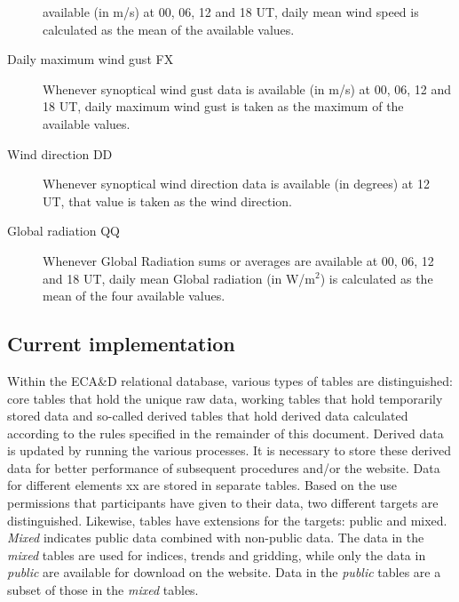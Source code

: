 \documentclass[a4paper,11pt]{article}
\begin{document}
\begin{description}
available (in m/s) at 00, 06, 12 and 18 UT, daily mean wind speed is
calculated as the mean of the available values.
\item[Daily maximum wind gust FX] Whenever synoptical wind gust data
is available (in m/s) at 00, 06, 12 and 18 UT, daily maximum wind gust
is taken as the maximum of the available values.
\item[Wind direction DD] Whenever synoptical wind direction data is
available (in degrees) at 12 UT, that value is taken as the wind
direction.
\item[Global radiation QQ] Whenever Global Radiation sums or averages
are available at 00, 06, 12 and 18 UT, daily mean Global radiation (in W/m$^2$)
is calculated as the mean of the four available values. 
\end{description}

\subsection{Current implementation}
\label{sec:currentimpl}

Within the ECA\&D relational database, various types of tables are
distinguished: core tables that hold the unique raw data, working
tables that hold temporarily stored data and so-called derived tables
that hold derived data calculated according to the rules specified in
the remainder of this document. Derived data is updated by running the
various processes. It is necessary to store these derived data for
better performance of subsequent procedures and/or the website. Data
for different elements xx are stored in separate tables. Based on the
use permissions that participants have given to their data, two
different targets are distinguished. Likewise, tables have extensions
for the targets: public and mixed. \emph{Mixed} indicates public data
combined with non-public data. The data in the \emph{mixed} tables are used
for indices, trends and gridding, while only the data in \emph{public} are
available for download on the website. Data in the \emph{public} tables are a
subset of those in the \emph{mixed} tables.
\end{document}
